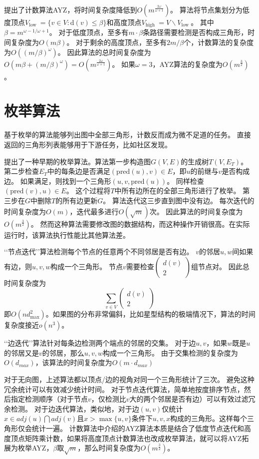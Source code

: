 \cite{alon1997finding}提出了计数算法AYZ，将时间复杂度降低到$O(m^{\frac{2\omega}{\omega +1}})$。
算法将节点集划分为低度顶点$V_{\text {low }}=\{v \in V: \mathrm{d}(v) \leq \beta\}$和高度顶点$V_{\text {high }}=V \backslash V_{\text {low }}$。
其中$\beta=m^{\omega-1 / \omega+1}$。
对于低度顶点，至多有$m \cdot \beta$条路径需要检测是否构成三角形，时间复杂度为$O(m \beta)$。
对于剩余的高度顶点，至多有$2m/ \beta$个，计数算法的复杂度为$O((m/ \beta)^{\omega})$。
因此算法的总时间复杂度为$O(m \beta + (m/ \beta)^{\omega} )=O( m^{\frac{2\omega}{\omega +1}})$。
如果$\omega = 3$，AYZ算法的复杂度为$O(m^{\frac{3}{2}})$。

\section{枚举算法}
基于枚举的算法能够列出图中全部三角形，计数反而成为微不足道的任务。
直接返回的三角形列表能够用于下游任务，比如社区发现\citep{palla2005uncovering}。

\cite{itai1978finding}提出了一种早期的枚举算法。算法第一步构造图$G(V,E)$的生成树$T(V,E_{T})$。
第二步检查$E_{T}$中的每条边是否满足$(\text{pred}(u),v) \in E$，即$u$的前继与$v$是否构成边。
如果满足，则找到一个三角形$(u,v,\text{pred}(u))$。
同样检查$(\text{pred}(v),u) \in E$。
这个过程将$T$中所有边所在的全部三角形进行了枚举。
第三步在$G$中删除$T$的所有边更新$G$。
算法迭代这三步直到图中没有边。
每次迭代的时间复杂度为$O(m)$，迭代最多进行$O(\sqrt{m})$次。
因此算法的时间复杂度为$O(m^{\frac{3}{2}})$。
然而这种算法需要修改图的数据结构，而这种操作开销很高。在实际运行时，该算法执行性能比其他算法差。

‘‘节点迭代’’算法检测每个节点的任意两个不同邻居是否有边。
$v$的邻居$u,w$间如果有边，则$u,v,w$构成一个三角形。
节点$v$需要检查$\left(\begin{array}{l}d(v) \\2\end{array}\right)$组节点对。
因此总时间复杂度为
$$\sum_{v\in V}\left(\begin{array}{l}d(v) \\2\end{array}\right)$$
即$O(nd^{2}_{\max})$。如果图的分布非常偏斜，比如星型结构的极端情况下，算法的时间复杂度接近$o(n^{3})$。

‘‘边迭代’’算法针对每条边检测两个端点的邻居的交集。
对于边$u,v$，如果$w$既是$u$的邻居又是$v$的邻居，那么$u,v,w$构成一个三角形。
由于交集检测的复杂度为$O(d_{max})$，该算法的时间复杂度为$O(m\cdot d_{max})$

对于无向图，上述算法都以顶点/边的视角对同一个三角形统计了三次。
避免这种冗余统计可以有效减少统计时间\citep{schank2005finding, latapy2008main}。
对于节点迭代算法，简单地按度排序节点，然后指定检测顺序（对于节点$v$，仅检测比$v$大的两个邻居是否有边）可以有效过滤冗余检测。
对于边迭代算法，类似地，对于边$(u,v)$仅统计$x \in adj(u) \bigcap adj(v)$且$x > \max \{u,v\}$条件下$u,v,x$构成的三角形。这样每个三角形仅会统计一遍。
计数算法中介绍的AYZ算法本质是结合了低度节点迭代和高度顶点矩阵乘计数，如果将高度顶点计数算法也改成枚举算法，就可以将AYZ拓展为枚举AYZ，$\beta$取$\sqrt{m}$，那么时间复杂度为$O(m^{\frac{3}{2}})$。

